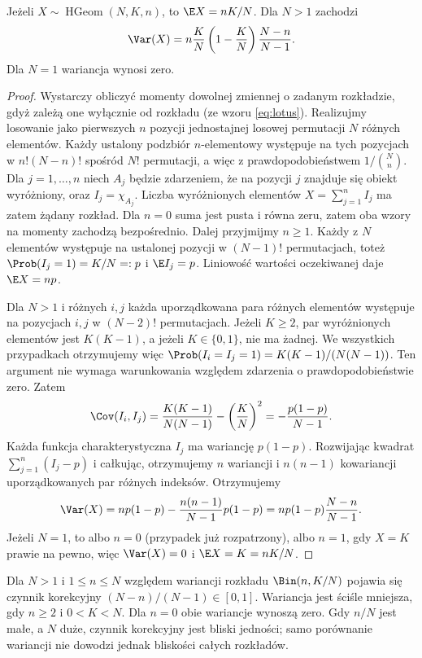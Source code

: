 \begin{twierdzenie}
Jeżeli $X\sim\operatorname{HGeom}(N,K,n)$, to
$\E X=nK/N$. Dla $N>1$ zachodzi
\[
\Var(X)=n\frac KN\left(1-\frac KN\right)\frac{N-n}{N-1}.
\]
Dla $N=1$ wariancja wynosi zero.
\end{twierdzenie}
\begin{proof}
Wystarczy obliczyć momenty dowolnej zmiennej o zadanym
rozkładzie, gdyż zależą one wyłącznie od rozkładu
(ze wzoru \eqref{eq:lotus}).
Realizujmy losowanie jako pierwszych $n$ pozycji jednostajnej
losowej permutacji $N$ różnych elementów. Każdy ustalony
podzbiór $n$-elementowy występuje na tych pozycjach
w $n!(N-n)!$ spośród $N!$ permutacji, a więc z prawdopodobieństwem
$1/\binom Nn$. Dla $j=1,\ldots,n$ niech $A_j$ będzie
zdarzeniem, że na pozycji $j$ znajduje się obiekt wyróżniony,
oraz $I_j=\chi_{A_j}$. Liczba wyróżnionych elementów
$X=\sum_{j=1}^n I_j$ ma zatem żądany rozkład.
Dla $n=0$ suma jest pusta i równa zeru, zatem oba
wzory na momenty zachodzą bezpośrednio. Dalej przyjmijmy
$n\geq1$. Każdy z $N$ elementów występuje na ustalonej pozycji
w $(N-1)!$ permutacjach, toteż
$\Prob(I_j=1)=K/N=:p$ i $\E I_j=p$.
Liniowość wartości oczekiwanej daje $\E X=np$.

Dla $N>1$ i różnych $i,j$ każda uporządkowana para
różnych elementów występuje na pozycjach $i,j$ w $(N-2)!$
permutacjach. Jeżeli $K\geq2$, par wyróżnionych elementów
jest $K(K-1)$, a jeżeli $K\in\{0,1\}$, nie ma żadnej.
We wszystkich przypadkach otrzymujemy więc
$\Prob(I_i=I_j=1)=K(K-1)/(N(N-1))$.
Ten argument nie wymaga warunkowania względem zdarzenia
o prawdopodobieństwie zero.
Zatem
\[
\Cov(I_i,I_j)=\frac{K(K-1)}{N(N-1)}-
\left(\frac KN\right)^2
=-\frac{p(1-p)}{N-1}.
\]
Każda funkcja charakterystyczna $I_j$ ma wariancję $p(1-p)$.
Rozwijając kwadrat $\sum_{j=1}^n(I_j-p)$ i całkując,
otrzymujemy $n$ wariancji i $n(n-1)$ kowariancji
uporządkowanych par różnych indeksów. Otrzymujemy
\[
\Var(X)=np(1-p)-\frac{n(n-1)}{N-1}p(1-p)
=np(1-p)\frac{N-n}{N-1}.
\]
Jeżeli $N=1$, to albo $n=0$ (przypadek już rozpatrzony),
albo $n=1$, gdy $X=K$ prawie na pewno, więc
$\Var(X)=0$ i $\E X=K=nK/N$.
\end{proof}

\begin{uwaga}
Dla $N>1$ i $1\leq n\leq N$ względem wariancji
rozkładu $\Bin(n,K/N)$ pojawia się czynnik korekcyjny
$(N-n)/(N-1)\in[0,1]$.
Wariancja jest ściśle mniejsza, gdy $n\geq2$ i $0<K<N$.
Dla $n=0$ obie wariancje wynoszą zero.
Gdy $n/N$ jest małe, a $N$ duże, czynnik korekcyjny
jest bliski jedności; samo porównanie wariancji nie
dowodzi jednak bliskości całych rozkładów.
\end{uwaga}


